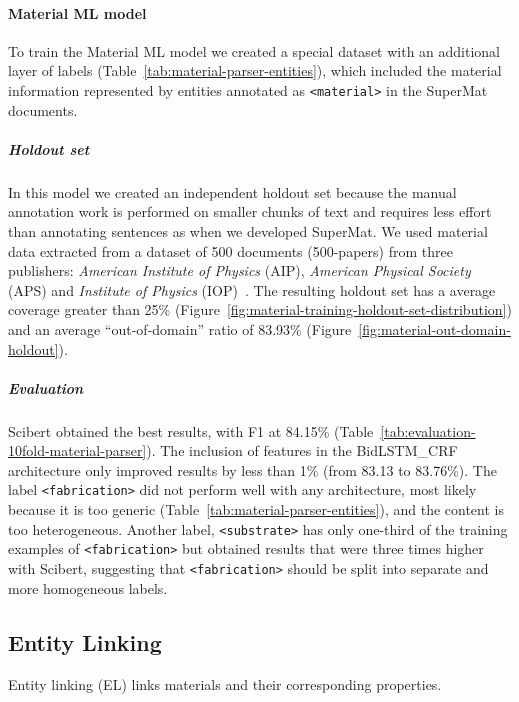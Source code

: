 \documentclass[]{interact}
\theoremstyle{plain}%
\theoremstyle{definition}
\theoremstyle{remark}
\begin{document}
\paragraph*{Material ML model}

To train the Material ML model we created a special dataset with an additional layer of labels (Table~\ref{tab:material-parser-entities}), which included the material information represented by entities annotated as \texttt{<material>} in the SuperMat documents.

\subparagraph*{Holdout set}
In this model we created an independent holdout set because the manual annotation work is performed on smaller chunks of text and requires less effort than annotating sentences as when we developed SuperMat.
We used material data extracted from a dataset of 500 documents (500-papers) from three publishers: \textit{American Institute of Physics} (AIP), \textit{American Physical Society} (APS) and \textit{Institute of Physics} (IOP)~\cite{foppiano2019proposal}.
The resulting holdout set has a average coverage greater than 25\% (Figure~\ref{fig:material-training-holdout-set-distribution}) and an average ``out-of-domain'' ratio of 83.93\% (Figure~\ref{fig:material-out-domain-holdout}).

\subparagraph*{Evaluation}

Scibert obtained the best results, with F1 at 84.15\% (Table~\ref{tab:evaluation-10fold-material-parser}).
The inclusion of features in the BidLSTM\_CRF architecture only improved results by less than 1\% (from 83.13 to 83.76\%).
The label \texttt{<fabrication>} did not perform well with any architecture, most likely because it is too generic (Table~\ref{tab:material-parser-entities}), and the content is too heterogeneous. Another label, \texttt{<substrate>} has only one-third of the training examples of \texttt{<fabrication>} but obtained results that were three times higher with Scibert, suggesting that \texttt{<fabrication>} should be split into separate and more homogeneous labels.

\subsection{Entity Linking}
\label{subsubsec:linking}

Entity linking (EL) links materials and their corresponding properties.
\end{document}
